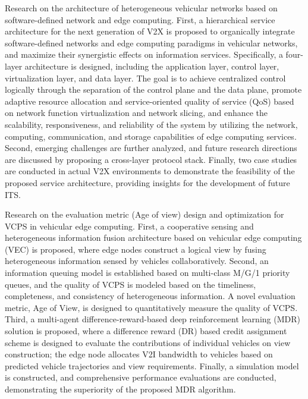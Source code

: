 \begin{eabstract}
 Research on the architecture of heterogeneous vehicular networks based on software-defined network and edge computing.
First, a hierarchical service architecture for the next generation of V2X is proposed to organically integrate software-defined networks and edge computing paradigms in vehicular networks, and maximize their synergistic effects on information services. 
Specifically, a four-layer architecture is designed, including the application layer, control layer, virtualization layer, and data layer. 
The goal is to achieve centralized control logically through the separation of the control plane and the data plane, promote adaptive resource allocation and service-oriented quality of service (QoS) based on network function virtualization and network slicing, and enhance the scalability, responsiveness, and reliability of the system by utilizing the network, computing, communication, and storage capabilities of edge computing services. 
Second, emerging challenges are further analyzed, and future research directions are discussed by proposing a cross-layer protocol stack. 
Finally, two case studies are conducted in actual V2X environments to demonstrate the feasibility of the proposed service architecture, providing insights for the development of future ITS.

 Research on the evaluation metric (Age of view) design and optimization for VCPS in vehicular edge computing.
First, a cooperative sensing and heterogeneous information fusion architecture based on vehicular edge computing (VEC) is proposed, where edge nodes construct a logical view by fusing heterogeneous information sensed by vehicles collaboratively. 
Second, an information queuing model is established based on multi-class M/G/1 priority queues, and the quality of VCPS is modeled based on the timeliness, completeness, and consistency of heterogeneous information. 
A novel evaluation metric, Age of View, is designed to quantitatively measure the quality of VCPS. 
Third, a multi-agent difference-reward-based deep reinforcement learning (MDR) solution is proposed, where a difference reward (DR) based credit assignment scheme is designed to evaluate the contributions of individual vehicles on view construction; the edge node allocates V2I bandwidth to vehicles based on predicted vehicle trajectories and view requirements. 
Finally, a simulation model is constructed, and comprehensive performance evaluations are conducted, demonstrating the superiority of the proposed MDR algorithm.


\end{eabstract}
